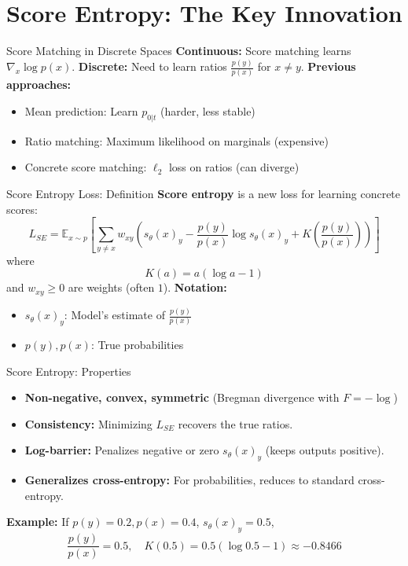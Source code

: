 \documentclass{beamer}
\begin{document}
\section{Score Entropy: The Key Innovation}

\begin{frame}{Score Matching in Discrete Spaces}
  \textbf{Continuous:} Score matching learns $\nabla_x \log p(x)$.
  \vspace{1em}
  \textbf{Discrete:} Need to learn ratios $\frac{p(y)}{p(x)}$ for $x \neq y$.
  \vspace{1em}
  \textbf{Previous approaches:}
  \begin{itemize}
    \item Mean prediction: Learn $p_{0|t}$ (harder, less stable)
    \item Ratio matching: Maximum likelihood on marginals (expensive)
    \item Concrete score matching: $\ell_2$ loss on ratios (can diverge)
  \end{itemize}
\end{frame}

\begin{frame}{Score Entropy Loss: Definition}
  \textbf{Score entropy} is a new loss for learning concrete scores:
  \[
    L_{SE} = \mathbb{E}_{x \sim p}\left[\sum_{y \neq x} w_{xy} \left( s_\theta(x)_y - \frac{p(y)}{p(x)} \log s_\theta(x)_y + K\left(\frac{p(y)}{p(x)}\right) \right) \right]
  \]
  where
  \[
    K(a) = a(\log a - 1)
  \]
  and $w_{xy} \geq 0$ are weights (often $1$).
  \vspace{1em}
  \textbf{Notation:}
  \begin{itemize}
    \item $s_\theta(x)_y$: Model's estimate of $\frac{p(y)}{p(x)}$
    \item $p(y), p(x)$: True probabilities
  \end{itemize}
\end{frame}

\begin{frame}{Score Entropy: Properties}
  \begin{itemize}
    \item \textbf{Non-negative, convex, symmetric} (Bregman divergence with $F = -\log$)
    \item \textbf{Consistency:} Minimizing $L_{SE}$ recovers the true ratios.
    \item \textbf{Log-barrier:} Penalizes negative or zero $s_\theta(x)_y$ (keeps outputs positive).
    \item \textbf{Generalizes cross-entropy:} For probabilities, reduces to standard cross-entropy.
  \end{itemize}
  \vspace{1em}
  \textbf{Example:} If $p(y) = 0.2, p(x) = 0.4$, $s_\theta(x)_y = 0.5$,
  \[
    \frac{p(y)}{p(x)} = 0.5,\quad K(0.5) = 0.5 (\log 0.5 - 1) \approx -0.8466
  \]
\end{frame}
\end{document}
